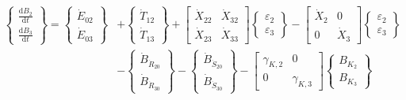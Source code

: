 \begin{equation} \label{eq:C-Expanded_Matrix_Form}
	\begin{split}
		\begin{Bmatrix}
			\frac{\mathrm{d}B_{2}}{\mathrm{d}t} \\[0.4em] %
			\frac{\mathrm{d}B_{3}}{\mathrm{d}t} 
		\end{Bmatrix}
		=
		\begin{Bmatrix}
			\dot{E}_{02}\\
			\dot{E}_{03}
		\end{Bmatrix}
		& +                                               %
		\begin{Bmatrix}
			\dot{T}_{12}\\
			\dot{T}_{13}
		\end{Bmatrix}
		+
		\begin{bmatrix}
			\dot{X}_{22} & \dot{X}_{32}\\
			\dot{X}_{23} & \dot{X}_{33}
		\end{bmatrix}
		\begin{Bmatrix}
			\varepsilon_{2}\\
			\varepsilon_{3}
		\end{Bmatrix}   
		- 
		\begin{bmatrix}
			\dot{X}_{2} & 0          \\
			0           & \dot{X}_{3}
		\end{bmatrix}
		\begin{Bmatrix}
			\varepsilon_{2}\\
			\varepsilon_{3}
		\end{Bmatrix} \\                                 %
		& -                                              %
		\begin{Bmatrix}
			\dot{B}_{\dot{R}_{20}}  \\
			\dot{B}_{\dot{R}_{30}} 
		\end{Bmatrix}
		-
		\begin{Bmatrix}
			\dot{B}_{\dot{S}_{20}}  \\
			\dot{B}_{\dot{S}_{30}} 
		\end{Bmatrix}
		-
		\begin{bmatrix}
			\gamma_{K,2} & 0          \\
			0            & \gamma_{K,3}
		\end{bmatrix}
		\begin{Bmatrix}
			B_{K_{2}}\\
			B_{K_{3}}
		\end{Bmatrix}		
	\end{split}
\end{equation}

